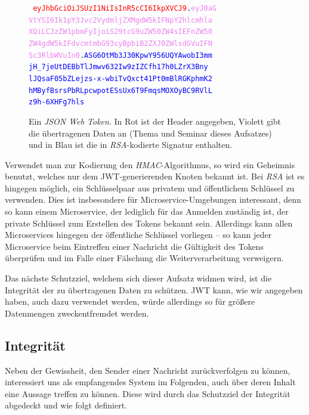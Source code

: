 \begin{figure}[b]
	\centering
	{\tt \textcolor{red}{
			eyJhbGciOiJSUzI1NiIsInR5cCI6IkpXVCJ9}.\textcolor{violet}{eyJ0aG\\
			VtYSI6Ik1pY3Jvc2VydmljZXMgdW5kIFNpY2hlcmhla\\
			XQiLCJzZW1pbmFyIjoiS29tcG9uZW50ZW4sIEFnZW50\\
			ZW4gdW5kIFdvcmtmbG93cyBpbiB2ZXJ0ZWlsdGVuIFN\\
			5c3RlbWVuIn0}.\textcolor{blue}{ASG6OtMb3J30KpwY956UQYAwobI3mm\\
			jH\_7jeUtDEBbTlJmwv632Iw9zIZCfh17h0LZrX3Bny\\
			lJQsaF05bZLejzs-x-wbiTvQxct41Pt0mBlRGKphmK2\\
			hMByfBsrsPbRLpcwpotESsUx6T9FmqsMOXOyBC9RVlL\\
			z9h-6XHFg7hls}}
	\caption{Ein \textit{JSON Web Token}. In Rot ist der Header angegeben, Violett gibt die übertragenen Daten an (Thema und Seminar dieses Aufsatzes) und in Blau ist die in \textit{RSA}-kodierte Signatur enthalten.}
	\label{fig:jwt}
\end{figure}

Verwendet man zur Kodierung den \textit{HMAC}-Algorithmus, so wird ein Geheimnis benutzt, welches nur dem JWT-generierenden Knoten bekannt ist. Bei \textit{RSA} ist es hingegen möglich, ein Schlüsselpaar aus privatem und öffentlichem Schlüssel zu verwenden. Dies ist insbesondere für Microservice-Umgebungen interessant, denn so kann einem Microservice, der lediglich für das Anmelden zuständig ist, der private Schlüssel zum Erstellen des Tokens bekannt sein. Allerdings kann allen Microservices hingegen der öffentliche Schlüssel vorliegen – so kann jeder Microservice beim Eintreffen einer Nachricht die Gültigkeit des Tokens überprüfen und im Falle einer Fälschung die Weiterverarbeitung verweigern.

Das nächste Schutzziel, welchem sich dieser Aufsatz widmen wird, ist die Integrität der zu übertragenen Daten zu schützen. JWT kann, wie wir angegeben haben, auch dazu verwendet werden, würde allerdings so für größere Datenmengen zweckentfremdet werden.


\subsection{Integrität}
\label{subsec:integrität}

Neben der Gewissheit, den Sender einer Nachricht zurückverfolgen zu können, interessiert uns als empfangendes System im Folgenden, auch über deren Inhalt eine Aussage treffen zu können. Diese wird durch das Schutzziel der Integrität abgedeckt und wie folgt definiert.

